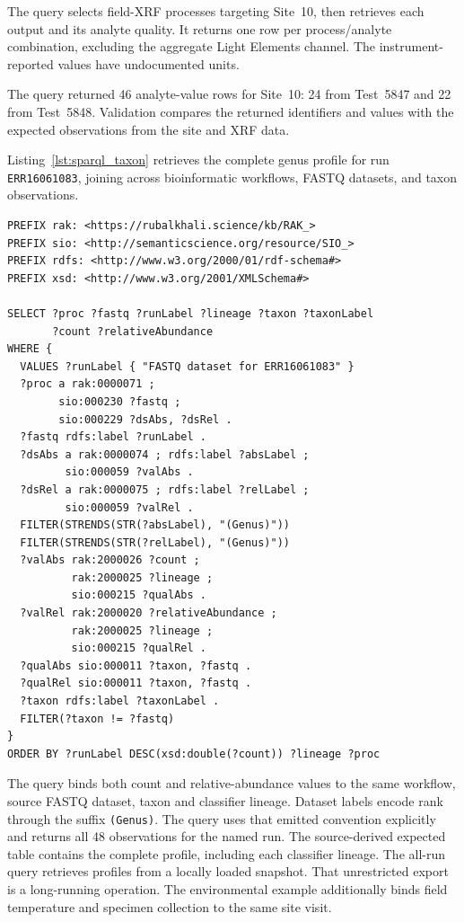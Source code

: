 \begin{revision}
The query selects field-XRF processes targeting Site~10, then
retrieves each output and its analyte quality. It returns one row
per process/analyte combination, excluding the aggregate Light
Elements channel. The instrument-reported values have undocumented units.

The query returned 46 analyte-value rows for Site~10: 24 from Test~5847
and 22 from Test~5848. Validation compares the returned identifiers and
values with the expected observations from the site and XRF data.

Listing~\ref{lst:sparql_taxon} retrieves the complete genus profile for
run \texttt{ERR16061083},
joining across bioinformatic workflows, FASTQ datasets, and taxon
observations.

\begin{lstlisting}[caption={Complete genus-level profile for run ERR16061083, ordered by descending read count and lineage.},label={lst:sparql_taxon},basicstyle=\ttfamily\scriptsize,frame=single]
PREFIX rak: <https://rubalkhali.science/kb/RAK_>
PREFIX sio: <http://semanticscience.org/resource/SIO_>
PREFIX rdfs: <http://www.w3.org/2000/01/rdf-schema#>
PREFIX xsd: <http://www.w3.org/2001/XMLSchema#>

SELECT ?proc ?fastq ?runLabel ?lineage ?taxon ?taxonLabel
       ?count ?relativeAbundance
WHERE {
  VALUES ?runLabel { "FASTQ dataset for ERR16061083" }
  ?proc a rak:0000071 ;
        sio:000230 ?fastq ;
        sio:000229 ?dsAbs, ?dsRel .
  ?fastq rdfs:label ?runLabel .
  ?dsAbs a rak:0000074 ; rdfs:label ?absLabel ;
         sio:000059 ?valAbs .
  ?dsRel a rak:0000075 ; rdfs:label ?relLabel ;
         sio:000059 ?valRel .
  FILTER(STRENDS(STR(?absLabel), "(Genus)"))
  FILTER(STRENDS(STR(?relLabel), "(Genus)"))
  ?valAbs rak:2000026 ?count ;
          rak:2000025 ?lineage ;
          sio:000215 ?qualAbs .
  ?valRel rak:2000020 ?relativeAbundance ;
          rak:2000025 ?lineage ;
          sio:000215 ?qualRel .
  ?qualAbs sio:000011 ?taxon, ?fastq .
  ?qualRel sio:000011 ?taxon, ?fastq .
  ?taxon rdfs:label ?taxonLabel .
  FILTER(?taxon != ?fastq)
}
ORDER BY ?runLabel DESC(xsd:double(?count)) ?lineage ?proc
\end{lstlisting}

The query binds both count and relative-abundance values to the same
workflow, source FASTQ dataset, taxon and classifier lineage. Dataset
labels encode rank through the suffix \texttt{(Genus)}.
The query uses that emitted convention explicitly and returns all
48 observations for the named run. The source-derived expected table
contains the complete profile, including each classifier lineage.
The all-run query retrieves profiles from a locally loaded snapshot. That unrestricted export
is a long-running operation. The environmental example additionally binds
field temperature and specimen collection to the same site visit.


\end{revision}
